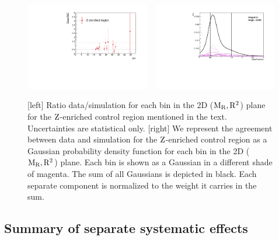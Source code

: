 \begin{figure}[htpb]
\centering
\includegraphics[width=0.48\textwidth,clip=true,trim=0 0.5cm 0.5cm 1.2cm]
{figures/razor_systematics/Data_MC_1D_g1Mbg1Y2l0ol}
~
\includegraphics[width=0.48\textwidth]{figures/razor_systematics/Zinv_g1Mbg1Y2l0ol2}
\caption{[left] Ratio data/simulation for each bin in the 2D ($\mathrm{M_R},\mathrm{R^2}$) plane for the
$\mathrm{Z}$-enriched control region mentioned in the text. Uncertainties are statistical only.
[right] We represent the agreement between data and simulation for the $\mathrm{Z}$-enriched control
region as a Gaussian probability density function for each bin in the 2D ($\mathrm{M_R},\mathrm{R^2}$) plane. Each
bin is shown as a Gaussian in a different shade of magenta. The sum of all Gaussians is
depicted in black. Each separate component is normalized to the weight it carries in the sum. 
\label{fig:boost_systematics_Zinv}}
\end{figure}


\subsection{Summary of separate systematic effects}

